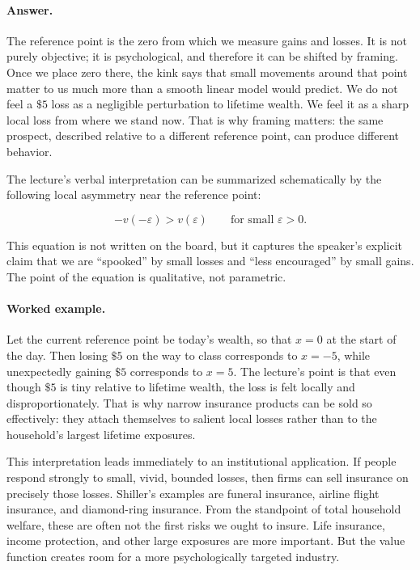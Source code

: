 \paragraph{Answer.} The reference point is the zero from which we measure gains and losses. It is not purely objective; it is psychological, and therefore it can be shifted by framing. Once we place zero there, the kink says that small movements around that point matter to us much more than a smooth linear model would predict. We do not feel a \(\$5\) loss as a negligible perturbation to lifetime wealth. We feel it as a sharp local loss from where we stand now. That is why framing matters: the same prospect, described relative to a different reference point, can produce different behavior.

The lecture's verbal interpretation can be summarized schematically by the following local asymmetry near the reference point:

\begin{equation}
-v(-\varepsilon) > v(\varepsilon)
\qquad \text{for small } \varepsilon>0.
\end{equation}

This equation is not written on the board, but it captures the speaker's explicit claim that we are ``spooked'' by small losses and ``less encouraged'' by small gains. The point of the equation is qualitative, not parametric.

\paragraph{Worked example.} Let the current reference point be today's wealth, so that \(x=0\) at the start of the day. Then losing \(\$5\) on the way to class corresponds to \(x=-5\), while unexpectedly gaining \(\$5\) corresponds to \(x=5\). The lecture's point is that even though \(\$5\) is tiny relative to lifetime wealth, the loss is felt locally and disproportionately. That is why narrow insurance products can be sold so effectively: they attach themselves to salient local losses rather than to the household's largest lifetime exposures.

This interpretation leads immediately to an institutional application. If people respond strongly to small, vivid, bounded losses, then firms can sell insurance on precisely those losses. Shiller's examples are funeral insurance, airline flight insurance, and diamond-ring insurance. From the standpoint of total household welfare, these are often not the first risks we ought to insure. Life insurance, income protection, and other large exposures are more important. But the value function creates room for a more psychologically targeted industry.

